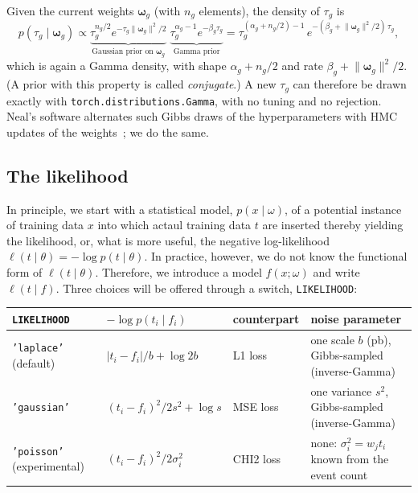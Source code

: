 \documentclass[11pt]{article}
\newcommand{\code}[1]{\texttt{#1}}
\newcommand{\bw}{\boldsymbol{\omega}}
\begin{document}
\begin{aside}
Given the current weights $\bw_g$ (with $n_g$ elements), the density of $\tau_g$ is
\[
p(\tau_g \mid \bw_g) \propto
\underbrace{\tau_g^{n_g/2} e^{-\tau_g \lVert\bw_g\rVert^2/2}}_{\text{Gaussian prior on }\bw_g}
\;\underbrace{\tau_g^{\alpha_g - 1} e^{-\beta_g \tau_g}}_{\text{Gamma prior}}
= \tau_g^{(\alpha_g + n_g/2) - 1}\, e^{-(\beta_g + \lVert\bw_g\rVert^2/2)\,\tau_g},
\]
which is again a Gamma density, with shape $\alpha_g + n_g/2$ and rate
$\beta_g + \lVert\bw_g\rVert^2/2$. (A prior with this property is called
\emph{conjugate}.) A new $\tau_g$ can therefore be drawn exactly with
\code{torch.distributions.Gamma}, with no tuning and no rejection. Neal's software
alternates such Gibbs draws of the hyperparameters with HMC updates of the
weights~\cite{neal1996}; we do the same.
\end{aside}

\subsection{The likelihood}
\label{sec:likelihood}

In principle, we start with a statistical model, $p(x \mid \omega)$, of a potential instance of training data $x$ into which actaul training data $t$ are inserted thereby yielding the likelihood, or, what is more useful, the negative log-likelihood $\ell(t \mid \theta) = -\log p(t \mid \theta)$. In practice, however, we do not know the functional form of $\ell(t \mid \theta)$. Therefore, we introduce a model $f(x; \omega)$ and write $\ell(t \mid f)$.
 Three choices will be offered through a switch,
\code{LIKELIHOOD}:
\begin{center}
\small
\begin{tabular}{lllp{}}
\toprule
\code{LIKELIHOOD} & $-\log p(t_i \mid f_i)$ & counterpart & noise parameter\\
\midrule
\code{'laplace'} (default) & $\lvert t_i - f_i\rvert / b + \log 2b$ & L1 loss
  & one scale $b$ (pb), Gibbs-sampled (inverse-Gamma)\\
\code{'gaussian'} & $(t_i - f_i)^2 / 2s^2 + \log s$ & MSE loss
  & one variance $s^2$, Gibbs-sampled (inverse-Gamma)\\
\code{'poisson'} (experimental) & $(t_i - f_i)^2 / 2\sigma_i^2$ & CHI2 loss
  & none: $\sigma_i^2 = w_j t_i$ known from the event count\\
\bottomrule
\end{tabular}
\end{center}
\end{document}

